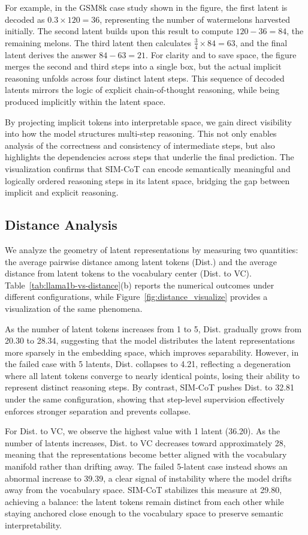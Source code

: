 For example, in the GSM8k case study shown in the figure, the first latent is decoded as $0.3 \times 120 = 36$, representing the number of watermelons harvested initially. The second latent builds upon this result to compute $120 - 36 = 84$, the remaining melons. The third latent then calculates $\tfrac{3}{4} \times 84 = 63$, and the final latent derives the answer $84 - 63 = 21$. For clarity and to save space, the figure merges the second and third steps into a single box, but the actual implicit reasoning unfolds across four distinct latent steps. This sequence of decoded latents mirrors the logic of explicit chain-of-thought reasoning, while being produced implicitly within the latent space.
  

By projecting implicit tokens into interpretable space, we gain direct visibility into how the model structures multi-step reasoning. This not only enables analysis of the correctness and consistency of intermediate steps, but also highlights the dependencies across steps that underlie the final prediction. The visualization confirms that SIM-CoT can encode semantically meaningful and logically ordered reasoning steps in its latent space, bridging the gap between implicit and explicit reasoning.


\subsection{Distance Analysis}
We analyze the geometry of latent representations by measuring two quantities: the average pairwise distance among latent tokens (Dist.) and the average distance from latent tokens to the vocabulary center (Dist. to VC).  
Table~\ref{tab:llama1b-vs-distance}(b) reports the numerical outcomes under different configurations, while Figure~\ref{fig:distance_visualize} provides a visualization of the same phenomena.

As the number of latent tokens increases from 1 to 5, Dist. gradually grows from 20.30 to 28.34, suggesting that the model distributes the latent representations more sparsely in the embedding space, which improves separability. However, in the failed case with 5 latents, Dist. collapses to 4.21, reflecting a degeneration where all latent tokens converge to nearly identical points, losing their ability to represent distinct reasoning steps. By contrast, SIM-CoT pushes Dist. to 32.81 under the same configuration, showing that step-level supervision effectively enforces stronger separation and prevents collapse.

For Dist. to VC, we observe the highest value with 1 latent (36.20). As the number of latents increases, Dist. to VC decreases toward approximately 28, meaning that the representations become better aligned with the vocabulary manifold rather than drifting away. The failed 5-latent case instead shows an abnormal increase to 39.39, a clear signal of instability where the model drifts away from the vocabulary space. SIM-CoT stabilizes this measure at 29.80, achieving a balance: the latent tokens remain distinct from each other while staying anchored close enough to the vocabulary space to preserve semantic interpretability.


